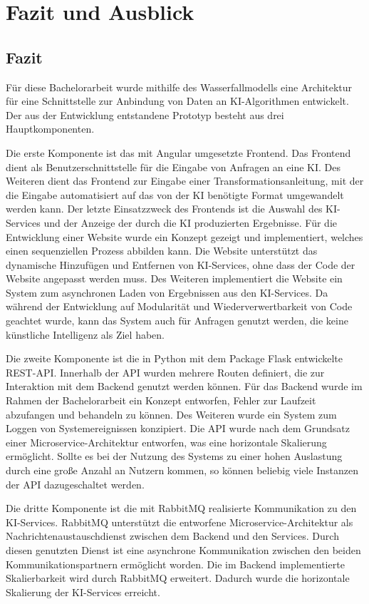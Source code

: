 \section{Fazit und Ausblick}
\subsection{Fazit}
Für diese Bachelorarbeit wurde mithilfe des Wasserfallmodells eine Architektur für eine Schnittstelle zur Anbindung von Daten an KI-Algorithmen entwickelt. Der aus der Entwicklung entstandene Prototyp besteht aus drei Hauptkomponenten. 

Die erste Komponente ist das mit Angular umgesetzte Frontend. Das Frontend dient als Benutzerschnittstelle für die Eingabe von Anfragen an eine KI. Des Weiteren dient das Frontend zur Eingabe einer Transformationsanleitung, mit der die Eingabe automatisiert auf das von der KI benötigte Format umgewandelt werden kann. Der letzte Einsatzzweck des Frontends ist die Auswahl des KI-Services und der Anzeige der durch die KI produzierten Ergebnisse. Für die Entwicklung einer Website wurde ein Konzept gezeigt und implementiert, welches einen sequenziellen Prozess abbilden kann. Die Website unterstützt das dynamische Hinzufügen und Entfernen von KI-Services, ohne dass der Code der Website angepasst werden muss. Des Weiteren implementiert die Website ein System zum asynchronen Laden von Ergebnissen aus den KI-Services. Da während der Entwicklung auf Modularität und Wiederverwertbarkeit von Code geachtet wurde, kann das System auch für Anfragen genutzt werden, die keine künstliche Intelligenz als Ziel haben. 

Die zweite Komponente ist die in Python mit dem Package Flask entwickelte REST-API. Innerhalb der API wurden mehrere Routen definiert, die zur Interaktion mit dem Backend genutzt werden können. Für das Backend wurde im Rahmen der Bachelorarbeit ein Konzept entworfen, Fehler zur Laufzeit abzufangen und behandeln zu können. Des Weiteren wurde ein System zum Loggen von Systemereignissen konzipiert. Die API wurde nach dem Grundsatz einer Microservice-Architektur entworfen, was eine horizontale Skalierung ermöglicht. Sollte es bei der Nutzung des Systems zu einer hohen Auslastung durch eine große Anzahl an Nutzern kommen, so können beliebig viele Instanzen der API dazugeschaltet werden.

Die dritte Komponente ist die mit RabbitMQ realisierte Kommunikation zu den KI-Services. RabbitMQ unterstützt die entworfene Microservice-Architektur als Nachrichtenaustauschdienst zwischen dem Backend und den Services. Durch diesen genutzten Dienst ist eine asynchrone Kommunikation zwischen den beiden Kommunikationspartnern ermöglicht worden. Die im Backend implementierte Skalierbarkeit wird durch RabbitMQ erweitert. Dadurch wurde die horizontale Skalierung der KI-Services erreicht.

